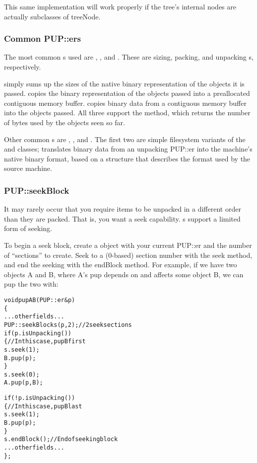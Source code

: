 This same implementation will work properly if the tree's
internal nodes are actually subclasses of treeNode.


\subsubsection{Common PUP::ers}
The most common s used are ,
, and .  These are sizing,
packing, and unpacking s, respectively.

 simply sums up the sizes of the native
binary representation of the objects it is passed.
 copies the binary representation of the
objects passed into a preallocated contiguous memory buffer.
 copies binary data from a contiguous memory
buffer into the objects passed.  All three support the
 method, which returns the number of bytes used
by the objects seen so far.

Other common s are , 
, and .  The first
two are simple filesystem variants of the  
and  classes;  translates
binary data from an unpacking PUP::er into the machine's
native binary format, based on a  structure
that describes the format used by the source machine.


\subsubsection{PUP::seekBlock}
It may rarely occur that you require items to be unpacked
in a different order than they are packed.  That is, you
want a seek capability.  s support a limited 
form of seeking.

To begin a seek block, create a  object
with your current PUP::er and the number of ``sections'' to 
create.  Seek to a (0-based) section number
with the seek method, and end the seeking with the endBlock method.
For example, if we have two objects A and B, where A's pup
depends on and affects some object B, we can pup the two with:

\begin{alltt}
void pupAB(PUP::er &p)
\{
  ... other fields ...
  PUP::seekBlock s(p,2); //2 seek sections
  if (p.isUnpacking()) 
  \{//In this case, pup B first
    s.seek(1);
    B.pup(p);
  \}
  s.seek(0);
  A.pup(p,B);
  
  if (!p.isUnpacking()) 
  \{//In this case, pup B last
    s.seek(1);
    B.pup(p);
  \}
  s.endBlock(); //End of seeking block
  ... other fields ...
\};
\end{alltt}

